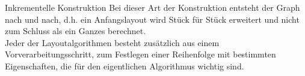 \begin{TOP}{Inkrementelle Konstruktion}
Bei dieser Art der Konstruktion entsteht der Graph nach und nach, d.h. ein Anfangslayout wird Stück für Stück erweitert und nicht zum Schluss als ein Ganzes berechnet.\\
Jeder der Layoutalgorithmen besteht zusätzlich aus einem Vorverarbeitungsschritt, zum Festlegen einer Reihenfolge mit bestimmten Eigenschaften, die für den eigentlichen Algorithmus wichtig sind.\\\\
\end{TOP}

